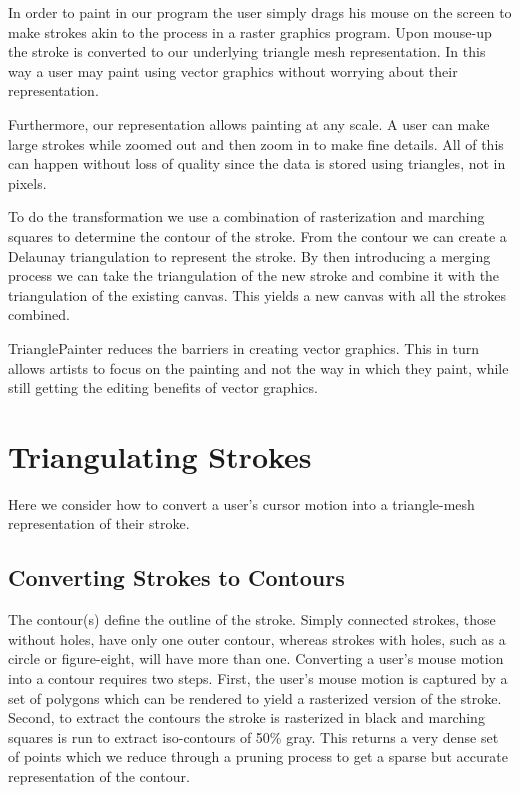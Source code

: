 \documentclass[conference]{acmsiggraph}
\begin{document}
In order to paint in our program the user simply drags his mouse on the screen to make
strokes akin to the process in a raster graphics program. Upon mouse-up the stroke is
converted to our underlying triangle mesh representation. In this way a user may paint using
vector graphics without worrying about their representation.

Furthermore, our representation allows painting at any scale. A user can make large strokes
while zoomed out and then zoom in to make fine details. All of this can happen without
loss of quality since the data is stored using triangles, not in pixels.

To do the transformation we use a combination of rasterization and marching squares to
determine the contour of the stroke. From the contour we can create a Delaunay triangulation
to represent the stroke. By then introducing a merging process we can take the triangulation
of the new stroke and combine it with the triangulation of the existing canvas. This yields
a new canvas with all the strokes combined.

TrianglePainter reduces the barriers in creating vector graphics. This in turn allows 
artists to focus on the painting and not the way in which they paint, while still 
getting the editing benefits of vector graphics.

\section{Triangulating Strokes}

Here we consider how to convert a user's cursor motion into a triangle-mesh representation
of their stroke.

\subsection{Converting Strokes to Contours}
The contour(s) define the outline of the stroke. Simply connected strokes, those without holes, have only 
one outer contour, whereas strokes with holes, such as a circle or 
figure-eight, will have more than one.
Converting a user's mouse motion into a contour requires two steps.
First, the user's mouse motion is captured by a set of polygons which can be
rendered to yield a rasterized version of the stroke.
Second, to extract the contours the stroke is rasterized in black and marching squares
is run to extract iso-contours of 50\% gray. This returns a very dense set of points 
which we reduce through a pruning process to
get a sparse but accurate representation of the contour.
\end{document}
